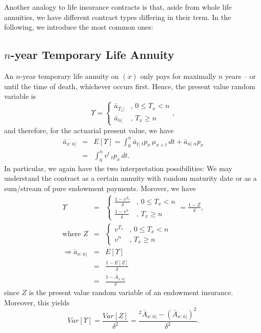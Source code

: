 \documentclass[11pt,fleqn,oneside]{book}
\begin{document}
\normalsize

Another analogy to life insurance contracts is that, aside from whole life annuities, we have different contract types differing in their term. In the following, we introduce the most common ones:

\subsection*{$n$-year Temporary Life Annuity}
An $n$-year temporary life annuity on $(x)$ only pays for maximally $n$ years -- or until the time of death, whichever occurs first. Hence, the present value random variable is
$$
\Upsilon = \left\{\begin{array}{cl}
\bar{a}_{\overline{T_x}|} &,\, 0 \leq T_x < n\\
\bar{a}_{\overline{n}|} &,\, T_x \geq n
\end{array}\right.,
$$
and therefore, for the actuarial present value, we have
\begin{eqnarray*}
\bar{a}_{x:\overline{n}|} &=& E[\Upsilon] = \int_0^n \bar{a}_{\overline{t}|}\,{_tp_x}\,\mu_{x+t}\,dt + \bar{a}_{\overline{n}|}\,{_np_x}\\
&=& \int_0^n v^t \, {_tp_x}\,dt.
\end{eqnarray*}
In particular, we again have the two interpretation possibilities: We may understand the contract as a certain annuity with random maturity date or as a sum/stream of pure endowment payments. Morover, we have
\begin{eqnarray*}
\Upsilon &=& \left\{\begin{array}{cl}
\frac{1-v^{T_x}}{\delta} &,\,0 \leq T_x < n\\
\frac{1-v^n}{\delta} &,\,T_x\geq n
\end{array}\right. = \frac{1-Z}{\delta},\\
\text{where } Z &=& \left\{\begin{array}{cl}
v^{T_x} &,\,0\leq T_x < n\\
v^n &,\,T_x \geq n
\end{array}\right.\\
\Rightarrow \bar{a}_{x:\overline{n}|} &=& E[\Upsilon]\\
&=& \frac{1-E[Z]}{\delta} \\
&=& \frac{1 - {\bar{A}_{x:\overline{n}|}}}{\delta}
\end{eqnarray*}
since $Z$ is the present value random variable of an endowment insurance. Moreover, this yields
$$
Var[\Upsilon] = \frac{Var[Z]}{\delta^2} = \frac{{^2\bar{A}_{x:\overline{n}|}} - \left({\bar{A}_{x:\overline{n}|}}\right)^2}{\delta^2}.
$$
\end{document}
